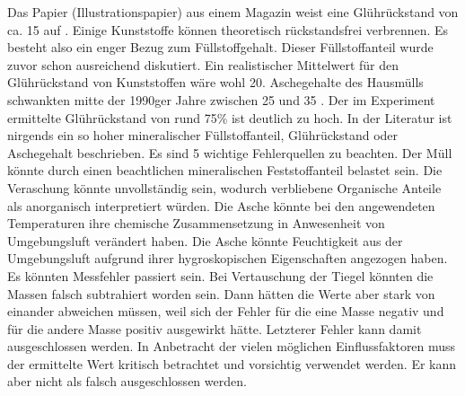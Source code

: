 Das Papier (Illustrationspapier) aus einem Magazin weist eine Glührückstand von ca. \SI{15}{\mpercent} auf \cite{roempppap}. Einige Kunststoffe können theoretisch rückstandsfrei verbrennen. Es besteht also ein enger Bezug zum Füllstoffgehalt. Dieser Füllstoffanteil wurde zuvor schon ausreichend diskutiert. Ein realistischer Mittelwert für den Glührückstand von Kunststoffen wäre wohl \SI{20}{\mpercent}.
Aschegehalte des Hausmülls schwankten mitte der 1990ger Jahre zwischen \SI{25}{\mpercent} und \SI{35}{\mpercent} \cite{scholz2013}.
Der im Experiment ermittelte Glührückstand von rund 75\% ist deutlich zu hoch. In der Literatur ist nirgends ein so hoher mineralischer Füllstoffanteil, Glührückstand oder Aschegehalt beschrieben. Es sind 5 wichtige Fehlerquellen zu beachten. Der Müll könnte durch einen beachtlichen mineralischen Feststoffanteil belastet sein. Die Veraschung könnte unvollständig sein, wodurch verbliebene Organische Anteile als anorganisch interpretiert würden. Die Asche könnte bei den angewendeten Temperaturen ihre chemische Zusammensetzung in Anwesenheit von Umgebungsluft verändert haben. Die Asche könnte Feuchtigkeit aus der Umgebungsluft aufgrund ihrer hygroskopischen Eigenschaften angezogen haben. Es könnten Messfehler passiert sein. Bei Vertauschung der Tiegel könnten die Massen falsch subtrahiert worden sein. Dann hätten die Werte aber stark von einander abweichen müssen, weil sich der Fehler für die eine Masse negativ und für die andere Masse positiv ausgewirkt hätte. Letzterer Fehler kann damit ausgeschlossen werden. 
In Anbetracht der vielen möglichen Einflussfaktoren muss der ermittelte Wert kritisch betrachtet und vorsichtig verwendet werden. Er kann aber nicht als falsch ausgeschlossen werden.
%


